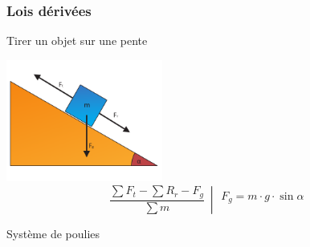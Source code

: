 \documentclass[12pt,a4paper]{article} %
\begin{document}
\subsubsection*{Lois dérivées}
Tirer un objet sur une pente \\
\begin{twocols}[0.5][0.5]
	\includegraphics[height=4cm]{Newton-Pente}
\nextcol
	$$
		\left.\frac{\sum F_t - \sum R_r - F_g}{\sum m}\:\middle|
		\begin{array}{l}
			F_g = m \cdot g \cdot \sin\alpha \\
		\end{array}
		\right.
	$$
\end{twocols}
\par\vspace{1em}
Système de poulies \\
\end{document}
